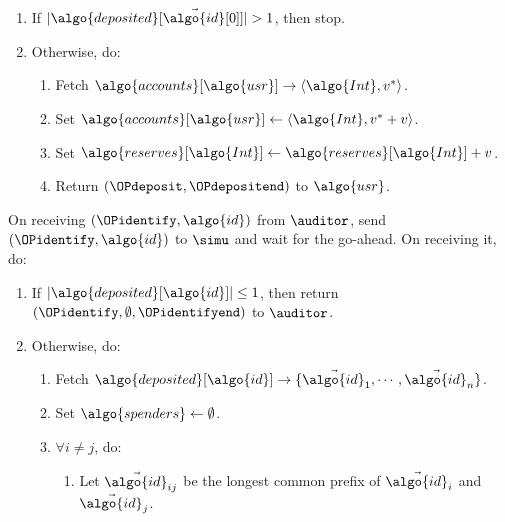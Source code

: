 \begin{framed}
\begin{enumerate}
\begin{enumerate}
	      \item If $|\algo{deposited}[\vec{\algo{id}}[0]]| > 1$, then stop.

	      \item Otherwise, do:

		\begin{enumerate}

		  \item Fetch $\algo{accounts}[\algo{usr}] \rightarrow \langle
\algo{Int}, v^*\rangle$.

		  \item Set $\algo{accounts}[\algo{usr}] \gets \langle
\algo{Int}, v^*+v \rangle$.

		  \item Set $\algo{reserves}[\algo{Int}] \gets
\algo{reserves}[\algo{Int}] + v$.

		  \item Return $(\OPdeposit, \OPdepositend)$ to $\algo{usr}$.

		\end{enumerate}

	    \end{enumerate}

	\end{enumerate}

	\fuinterface{\OPidentify} On receiving $(\OPidentify, \algo{id})$ from $\auditor$,
send $(\OPidentify, \algo{id})$ to $\simu$ and wait for the go-ahead. On receiving
it, do:

	\begin{enumerate}

	  \item If $|\algo{deposited}[\algo{id}]| \leq 1$, then return $(\OPidentify,
\emptyset, \OPidentifyend)$ to $\auditor$.

	  \item Otherwise, do:

	    \begin{enumerate}

	      \item Fetch $\algo{deposited}[\algo{id}] \rightarrow \{\vec{\algo{id}}_1,
\cdots, \vec{\algo{id}}_n\}$.

	      \item Set $\algo{spenders} \leftarrow \emptyset$.

	      \item $\forall i\neq j$, do:

		\begin{enumerate}

		  \item Let $\vec{\algo{id}}_{ij}$ be the longest common prefix
of $\vec{\algo{id}}_i$ and $\vec{\algo{id}}_j$.


\end{enumerate}
\end{enumerate}
\end{enumerate}
\end{framed}
